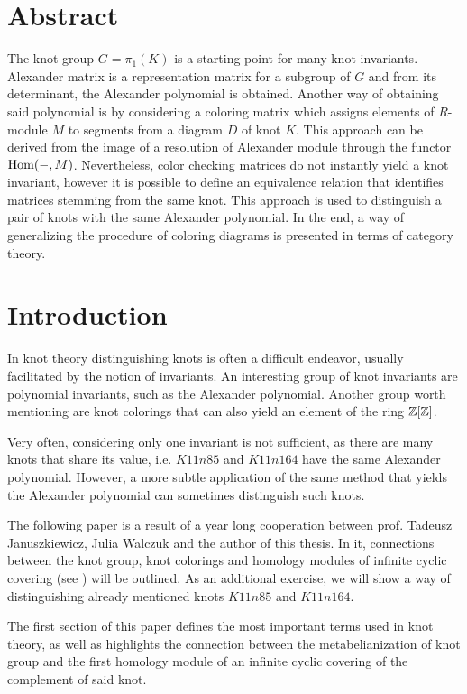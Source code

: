 \section*{Abstract}

The knot group $G=\pi_1(K)$ is a starting point for many knot invariants. Alexander matrix is a representation matrix for a subgroup of $G$ and from its determinant, the Alexander polynomial is obtained. Another way of obtaining said polynomial is by considering a coloring matrix which assigns elements of $R$-module $M$ to segments from a diagram $D$ of knot $K$. This approach can be derived from the image of a resolution of Alexander module through the functor $\operatorname{Hom}(-, M)$. Nevertheless, color checking matrices do not instantly yield a knot invariant, however it is possible to define an equivalence relation that identifies matrices stemming from the same knot. This approach is used to distinguish a pair of knots with the same Alexander polynomial. In the end, a way of generalizing the procedure of coloring diagrams is presented in terms of category theory.

\section*{Introduction}

In knot theory distinguishing knots is often a difficult endeavor, usually facilitated by the notion of invariants. An interesting group of knot invariants are polynomial invariants, such as the Alexander polynomial. Another group worth mentioning are knot colorings that can also yield an element of the ring $\operatorname{\mathbb{Z}}[\operatorname{\mathbb{Z}}]$.

Very often, considering only one invariant is not sufficient, as there are many knots that share its value, i.e. $K11n85$ and $K11n164$ have the same Alexander polynomial. However, a more subtle application of the same method that yields the Alexander polynomial can sometimes distinguish such knots.

The following paper is a result of a year long cooperation between prof. Tadeusz Januszkiewicz, Julia Walczuk and the author of this thesis. In it, connections between the knot group, knot colorings and homology modules of infinite cyclic covering (see \cite{milnor_infinite_cyclic}) will be outlined. As an additional exercise, we will show a way of distinguishing already mentioned knots $K11n85$ and $K11n164$.

The first section of this paper defines the most important terms used in knot theory, as well as highlights the connection between the metabelianization of knot group and the first homology module of an infinite cyclic covering of the complement of said knot. 

